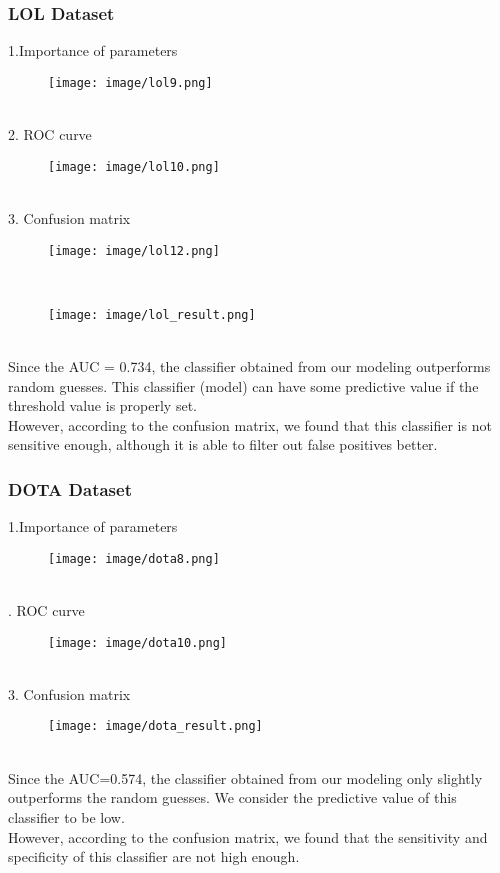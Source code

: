 \documentclass[a4paper,fleqn]{cas-sc}
\begin{document}
\subsubsection{LOL Dataset}
 1.Importance of parameters\\
 \begin{figure}[h!]
	\centering
		\texttt{[image: image/lol9.png]}
	\caption{}
	\label{FIG:1}
\end{figure}\\
2. ROC curve\\
\begin{figure}[h!]
	\centering
		\texttt{[image: image/lol10.png]}
	\caption{}
	\label{FIG:1}
\end{figure}\\
3. Confusion matrix\\
\begin{figure}[h!]
	\centering
		\texttt{[image: image/lol12.png]}
	\caption{}
	\label{FIG:1}
\end{figure}\\
\begin{figure}[h!]
	\centering
		\texttt{[image: image/lol\_result.png]}
	\caption{}
	\label{FIG:1}
\end{figure}\\
Since the AUC = 0.734, the classifier obtained from our modeling outperforms random guesses. This classifier (model) can have some predictive value if the threshold value is properly set.\\
However, according to the confusion matrix, we found that this classifier is not sensitive enough, although it is able to filter out false positives better.\\
\subsubsection{DOTA Dataset}
 1.Importance of parameters\\
 \begin{figure}[h!]
	\centering
		\texttt{[image: image/dota8.png]}
	\caption{}
	\label{FIG:1}
\end{figure}\\
. ROC curve\\
\begin{figure}[h!]
	\centering
		\texttt{[image: image/dota10.png]}
	\caption{}
	\label{FIG:1}
\end{figure}\\
3. Confusion matrix\\
\begin{figure}[h!]
	\centering
		\texttt{[image: image/dota\_result.png]}
	\caption{}
	\label{FIG:1}
\end{figure}\\
Since the AUC=0.574, the classifier obtained from our modeling only slightly outperforms the random guesses. We consider the predictive value of this classifier to be low.\\
However, according to the confusion matrix, we found that the sensitivity and specificity of this classifier are not high enough.\\
\end{document}
